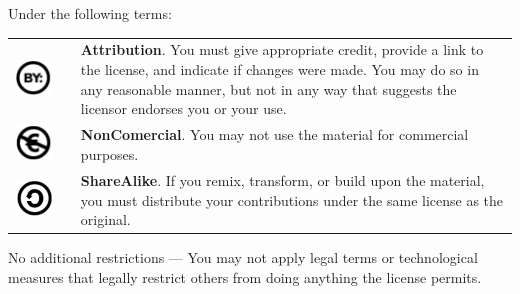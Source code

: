 Under the following terms:
\begin{center}
\begin{tabular}{ccp{10cm}}
\includegraphics[scale=0.15]{img/cc-by} & \quad & \textbf{Attribution}. You must give appropriate credit, provide a link
to the license, and indicate if changes were made. You may do so in any reasonable manner, but not in any way that
suggests the licensor endorses you or your use.\\ 
\includegraphics[scale=0.15]{img/cc-e} & \quad & \textbf{NonComercial}. You may not use the material for commercial purposes.\\ 
\includegraphics[scale=0.15]{img/cc-c} & \quad & \textbf{ShareAlike}. If you remix, transform, or build upon the
material, you must distribute your contributions under the same license as the original. 
\end{tabular}
\end{center}

No additional restrictions — You may not apply legal terms or technological measures that legally restrict others from
doing anything the license permits.
